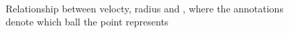 \documentclass[11pt,a4paper]{article}
\begin{document}
  \begin{figure}[H]
    \center
    \\
    \caption{Relationship between velocty, radius and , where the annotations denote which ball the point represents}
    \label{fig:plots1}
  \end{figure}
\end{document}
